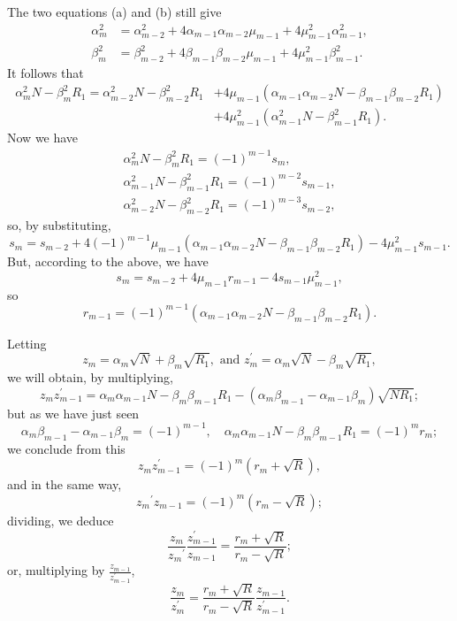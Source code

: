 \documentclass[oneside, 12 pt, leqno]{memoir}
\begin{document}
The two equations (a) and (b) still give
\[\begin{aligned}
\alpha_m^2&=\alpha_{m-2}^2+4 \alpha_{m-1} \alpha_{m-2} \mu_{m-1}+4 \mu_{m-1}^2 \alpha_{m-1}^2, \\
\beta_m^2&=\beta_{m-2}^2+4 \beta_{m-1} \beta_{m-2} \mu_{m-1}+4 \mu_{m-1}^2 \beta_{m-1}^2.
\end{aligned}
\]
It follows that
\[\begin{aligned}
\alpha_m^2 N-\beta_m^2 R_1=\alpha_{m-2}^2 N-\beta_{m-2}^2 R_1&+4 \mu_{m-1}\left(\alpha_{m-1} \alpha_{m-2} N-\beta_{m-1} \beta_{m-2} R_1\right) \\
&+4 \mu_{m-1}^2\left(\alpha_{m-1}^2 N-\beta_{m-1}^2 R_1\right).
\end{aligned}\]
Now we have
\[\begin{gathered}
\alpha_m^2 N-\beta_m^2 R_1=(-1)^{m-1} s_m, \\
\alpha_{m-1}^2 N-\beta_{m-1}^2 R_1=(-1)^{m-2} s_{m-1}, \\
\alpha_{m-2}^2 N-\beta_{m-2}^2 R_1=(-1)^{m-3} s_{m-2},
\end{gathered}\]
so, by substituting,
\[s_m=s_{m-2}+4(-1)^{m-1} \mu_{m-1}\left(\alpha_{m-1} \alpha_{m-2} N-\beta_{m-1} \beta_{m-2} R_1\right)-4 \mu_{m-1}^2 s_{m-1} .\]
But, according to the above, we have
\[s_m=s_{m-2}+4 \mu_{m-1} r_{m-1}-4 s_{m-1} \mu_{m-1}^2,\]
so
\[r_{m-1}=(-1)^{m-1}\left(\alpha_{m-1} \alpha_{m-2} N-\beta_{m-1} \beta_{m-2} R_1\right).\]

Letting
\[z_m=\alpha_m \sqrt{N}+\beta_m \sqrt{R_1}, \text { and } z_m^{\prime}=\alpha_m \sqrt{N}-\beta_m \sqrt{R_1},\]
we will obtain, by multiplying,
\[z_m z_{m-1}^{\prime}=\alpha_m \alpha_{m-1} N-\beta_m \beta_{m-1} R_1-\left(\alpha_m \beta_{m-1}-\alpha_{m-1} \beta_m\right) \sqrt{N R_1};\]
but as we have just seen
\[\alpha_m \beta_{m-1}-\alpha_{m-1} \beta_m=(-1)^{m-1}, \quad \alpha_m \alpha_{m-1} N-\beta_m \beta_{m-1} R_1=(-1)^m r_m;\]
we conclude from this
\[z_m z_{m-1}^{\prime}=(-1)^m\left(r_m+\sqrt{R}\right),\]
and in the same way,
\[{z_m}^{\prime} z_{m-1}=(-1)^m\left(r_m-\sqrt{R}\right);\]
dividing, we deduce
\[\frac{z_m}{{z_m}^{\prime}} \frac{z_{m-1}^{\prime}}{z_{m-1}}=\frac{r_m+\sqrt{R}}{r_m-\sqrt{R}};\]
or, multiplying by \(\frac{z_{m-1}}{z_{m-1}^{\prime}}\),
\[\frac{z_m}{z_m^{\prime}}=\frac{r_m+\sqrt{R}}{r_m-\sqrt{R}} \frac{z_{m-1}}{z_{m-1}^{\prime}}.\]
\end{document}
